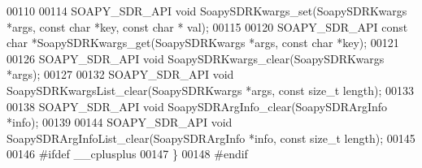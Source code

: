 \begin{DoxyCode}
00110 
00114 SOAPY_SDR_API \textcolor{keywordtype}{void} SoapySDRKwargs_set(SoapySDRKwargs *args, \textcolor{keyword}{const} \textcolor{keywordtype}{char} *key, \textcolor{keyword}{const} \textcolor{keywordtype}{char} *
      val);
00115 
00120 SOAPY_SDR_API \textcolor{keyword}{const} \textcolor{keywordtype}{char} *SoapySDRKwargs_get(SoapySDRKwargs *args, \textcolor{keyword}{const} \textcolor{keywordtype}{char} *key);
00121 
00126 SOAPY_SDR_API \textcolor{keywordtype}{void} SoapySDRKwargs_clear(SoapySDRKwargs *args);
00127 
00132 SOAPY_SDR_API \textcolor{keywordtype}{void} SoapySDRKwargsList_clear(SoapySDRKwargs *args, \textcolor{keyword}{const} \textcolor{keywordtype}{size\_t} 
      length);
00133 
00138 SOAPY_SDR_API \textcolor{keywordtype}{void} SoapySDRArgInfo_clear(SoapySDRArgInfo *info);
00139 
00144 SOAPY_SDR_API \textcolor{keywordtype}{void} SoapySDRArgInfoList_clear(SoapySDRArgInfo *info, \textcolor{keyword}{const} \textcolor{keywordtype}{size\_t} 
      length);
00145 
00146 \textcolor{preprocessor}{#ifdef \_\_cplusplus}
00147 \}
00148 \textcolor{preprocessor}{#endif}
\end{DoxyCode}
